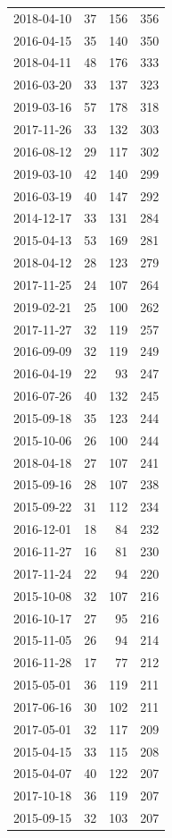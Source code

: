 \begin{tabular}{lrrr}
2018-04-10 & 37 & 156 & 356 \\
2016-04-15 & 35 & 140 & 350 \\
2018-04-11 & 48 & 176 & 333 \\
2016-03-20 & 33 & 137 & 323 \\
2019-03-16 & 57 & 178 & 318 \\
2017-11-26 & 33 & 132 & 303 \\
2016-08-12 & 29 & 117 & 302 \\
2019-03-10 & 42 & 140 & 299 \\
2016-03-19 & 40 & 147 & 292 \\
2014-12-17 & 33 & 131 & 284 \\
2015-04-13 & 53 & 169 & 281 \\
2018-04-12 & 28 & 123 & 279 \\
2017-11-25 & 24 & 107 & 264 \\
2019-02-21 & 25 & 100 & 262 \\
2017-11-27 & 32 & 119 & 257 \\
2016-09-09 & 32 & 119 & 249 \\
2016-04-19 & 22 & 93 & 247 \\
2016-07-26 & 40 & 132 & 245 \\
2015-09-18 & 35 & 123 & 244 \\
2015-10-06 & 26 & 100 & 244 \\
2018-04-18 & 27 & 107 & 241 \\
2015-09-16 & 28 & 107 & 238 \\
2015-09-22 & 31 & 112 & 234 \\
2016-12-01 & 18 & 84 & 232 \\
2016-11-27 & 16 & 81 & 230 \\
2017-11-24 & 22 & 94 & 220 \\
2015-10-08 & 32 & 107 & 216 \\
2016-10-17 & 27 & 95 & 216 \\
2015-11-05 & 26 & 94 & 214 \\
2016-11-28 & 17 & 77 & 212 \\
2015-05-01 & 36 & 119 & 211 \\
2017-06-16 & 30 & 102 & 211 \\
2017-05-01 & 32 & 117 & 209 \\
2015-04-15 & 33 & 115 & 208 \\
2015-04-07 & 40 & 122 & 207 \\
2017-10-18 & 36 & 119 & 207 \\
2015-09-15 & 32 & 103 & 207 \\

\end{tabular}
